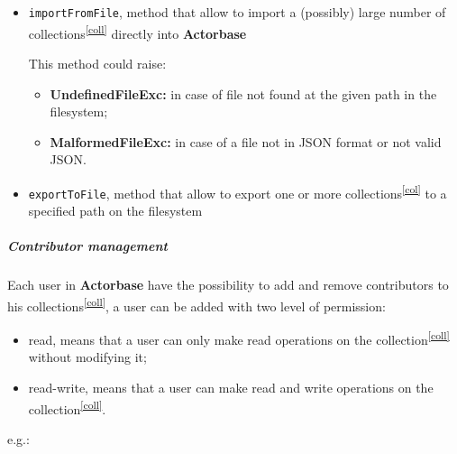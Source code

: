 \documentclass{scalatekids-article}
\begin{document}
\begin{itemize}
\item \verb=importFromFile=, method that allow to import a (possibly) large number of collections\textsuperscript{\ref{coll}}
  directly into \textbf{Actorbase}

  This method could raise:
  \begin{itemize}
  \item \textbf{UndefinedFileExc:} in case of file not found at the given path in the filesystem;
  \item \textbf{MalformedFileExc:} in case of a file not in JSON format or not valid JSON.
  \end{itemize}

\item \verb=exportToFile=, method that allow to export one or more collections\textsuperscript{\ref{col}} to a specified path on the filesystem

\end{itemize}

\subparagraph{Contributor management}

Each user in \textbf{Actorbase} have the possibility to add and remove contributors
to his collections\textsuperscript{\ref{coll}}, a user can be added with two level of
permission:
\begin{itemize}
\item read, means that a user can only make read operations on the collection\textsuperscript{\ref{coll}} without modifying it;
\item read-write, means that a user can make read and write operations on the collection\textsuperscript{\ref{coll}}.
\end{itemize}
e.g.:
\end{document}
